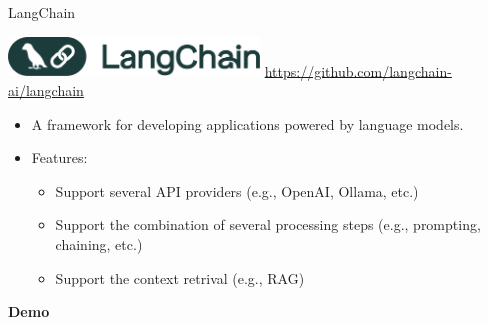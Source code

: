 \documentclass[presentation, 10pt]{beamer}\mode<presentation>{\usetheme{AMSBolognaFC}}
\begin{document}
\begin{frame}{LangChain}
\begin{center}
\includegraphics[width=0.5\textwidth]{img/logo.png}
\url{https://github.com/langchain-ai/langchain}
\end{center}
\begin{itemize}
	\item A framework for developing applications powered by language models.
	\item Features:	
	\begin{itemize}
		\item Support several API providers (e.g., OpenAI, Ollama, etc.)
		\item Support the combination of several processing steps (e.g., prompting, chaining, etc.)
		\item Support the context retrival (e.g., RAG)
	\end{itemize}
\end{itemize}
\begin{center}
\huge{\textbf{Demo}}
\end{center}
\end{frame}
\end{document}
